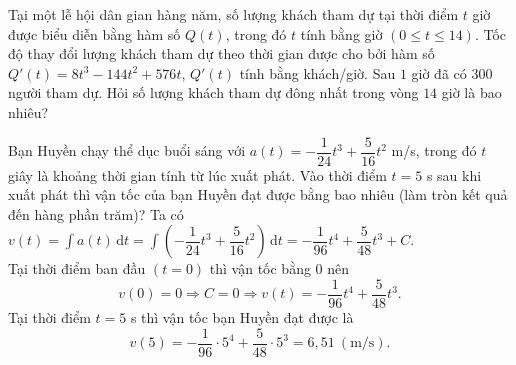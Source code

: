 \begin{bt}%
	Tại một lễ hội dân gian hàng năm, số lượng khách tham dự tại thời điểm $t$ giờ được biểu diễn bằng hàm số $Q(t)$, trong đó $t$ tính bằng giờ $(0\leq t \leq 14)$. Tốc độ thay đổi lượng khách tham dự theo thời gian được cho bởi hàm số $Q'(t)=8t^3-144t^2+576t$, $Q'(t)$ tính bằng khách/giờ. Sau $1$ giờ đã có $300$ người tham dự. Hỏi số lượng khách tham dự đông nhất trong vòng $14$ giờ là bao nhiêu?
\end{bt}

\begin{bt}%

	Bạn Huyền chạy thể dục buổi sáng với $a(t)=-\dfrac{1}{24} t^{3}+\dfrac{5}{16} t^{2}$ m/s, trong đó $t$ giây là khoảng thời gian tính từ lúc xuất phát. Vào thời điểm $t=5$ s sau khi xuất phát thì vận tốc của bạn Huyền đạt được bằng bao nhiêu (làm tròn kết quả đến hàng phần trăm)?
	\loigiai
	{
		Ta có $v(t)=\displaystyle\int a(t) \mathrm{\,d}t=\int\left(-\dfrac{1}{24} t^{3}+\dfrac{5}{16} t^{2}\right)\mathrm{\,d}t=-\dfrac{1}{96} t^{4}+\dfrac{5}{48} t^{3}+C$.\\
		Tại thời điểm ban đầu $(t=0)$ thì vận tốc bằng $0$ nên $$v(0)=0 \Rightarrow C=0 \Rightarrow v(t)=-\dfrac{1}{96} t^{4}+\dfrac{5}{48} t^{3}.$$
		Tại thời điểm $t=5$ s thì vận tốc bạn Huyền đạt được là $$v(5)=-\dfrac{1}{96} \cdot 5^{4}+\dfrac{5}{48} \cdot 5^{3}=6{,}51~ \mathrm{ (m/s)}.$$
	}
\end{bt}

